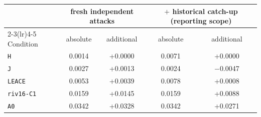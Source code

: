 \begin{tabular}{@{}lcccc@{}}
\toprule
& \multicolumn{2}{c}{fresh independent attacks} & \multicolumn{2}{c}{$+$ historical catch-up (reporting scope)} \\
\cmidrule(lr){2-3}\cmidrule(lr){4-5}
Condition & absolute & additional & absolute & additional \\
\midrule
\texttt{H} & 0.0014 & +0.0000 & 0.0071 & +0.0000 \\
\texttt{J} & 0.0027 & +0.0013 & 0.0024 & $-$0.0047 \\
\texttt{LEACE} & 0.0053 & +0.0039 & 0.0078 & +0.0008 \\
\texttt{riv16-C1} & 0.0159 & +0.0145 & 0.0159 & +0.0088 \\
\texttt{A0} & 0.0342 & +0.0328 & 0.0342 & +0.0271 \\
\bottomrule
\end{tabular}
